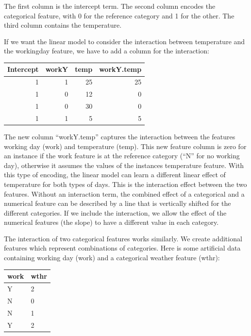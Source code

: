 \documentclass[
  10pt,
]{scrbook}
\begin{document}
The first column is the intercept term.
The second column encodes the categorical feature, with 0 for the reference category and 1 for the other.
The third column contains the temperature.

If we want the linear model to consider the interaction between temperature and the workingday feature, we have to add a column for the interaction:

\begin{table}
\centering
\begin{tabular}{rrrr}
\toprule
Intercept & workY & temp & workY.temp\\
\midrule
1 & 1 & 25 & 25\\
1 & 0 & 12 & 0\\
1 & 0 & 30 & 0\\
1 & 1 & 5 & 5\\
\bottomrule
\end{tabular}
\end{table}

The new column ``workY.temp'' captures the interaction between the features working day (work) and temperature (temp).
This new feature column is zero for an instance if the work feature is at the reference category (``N'' for no working day), otherwise it assumes the values of the instances temperature feature.
With this type of encoding, the linear model can learn a different linear effect of temperature for both types of days.
This is the interaction effect between the two features.
Without an interaction term, the combined effect of a categorical and a numerical feature can be described by a line that is vertically shifted for the different categories.
If we include the interaction, we allow the effect of the numerical features (the slope) to have a different value in each category.

The interaction of two categorical features works similarly.
We create additional features which represent combinations of categories.
Here is some artificial data containing working day (work) and a categorical weather feature (wthr):

\begin{table}
\centering
\begin{tabular}{ll}
\toprule
work & wthr\\
\midrule
Y & 2\\
N & 0\\
N & 1\\
Y & 2\\
\bottomrule
\end{tabular}
\end{table}
\end{document}
